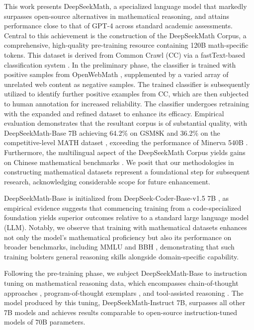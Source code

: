 This work presents DeepSeekMath, a specialized language model that markedly surpasses open-source alternatives in mathematical reasoning, and attains performance close to that of GPT-4 across standard academic assessments. Central to this achievement is the construction of the DeepSeekMath Corpus, a comprehensive, high-quality pre-training resource containing 120B math-specific tokens. This dataset is derived from Common Crawl (CC) via a fastText-based classification system \citep{joulin2016fasttext}. In the preliminary phase, the classifier is trained with positive samples from OpenWebMath \citep{openwebmath}, supplemented by a varied array of unrelated web content as negative samples. The trained classifier is subsequently utilized to identify further positive examples from CC, which are then subjected to human annotation for increased reliability. The classifier undergoes retraining with the expanded and refined dataset to enhance its efficacy. Empirical evaluation demonstrates that the resultant corpus is of substantial quality, with DeepSeekMath-Base 7B achieving 64.2\% on GSM8K \citep{gsm8k} and 36.2\% on the competitive-level MATH dataset \citep{MATH}, exceeding the performance of Minerva 540B \citep{minerva}. Furthermore, the multilingual aspect of the DeepSeekMath Corpus yields gains on Chinese mathematical benchmarks \citep{wei2023cmath,agieval}. We posit that our methodologies in constructing mathematical datasets represent a foundational step for subsequent research, acknowledging considerable scope for future enhancement.

DeepSeekMath-Base is initialized from DeepSeek-Coder-Base-v1.5 7B \citep{deepseek-coder}, as empirical evidence suggests that commencing training from a code-specialized foundation yields superior outcomes relative to a standard large language model (LLM). Notably, we observe that training with mathematical datasets enhances not only the model's mathematical proficiency but also its performance on broader benchmarks, including MMLU \citep{mmlu} and BBH \citep{bbh}, demonstrating that such training bolsters general reasoning skills alongside domain-specific capability.

Following the pre-training phase, we subject DeepSeekMath-Base to instruction tuning on mathematical reasoning data, which encompasses chain-of-thought approaches \citep{cot}, program-of-thought exemplars \citep{pot,pal}, and tool-assisted reasoning \citep{tora}. The model produced by this tuning, DeepSeekMath-Instruct 7B, surpasses all other 7B models and achieves results comparable to open-source instruction-tuned models of 70B parameters.

